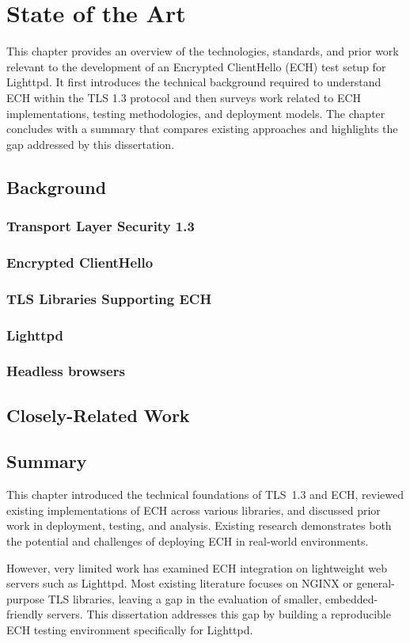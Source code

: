 \chapter{State of the Art}

This chapter provides an overview of the technologies, standards, and prior work
relevant to the development of an Encrypted ClientHello (ECH) test setup for Lighttpd.
It first introduces the technical background required to understand ECH within the
TLS 1.3 protocol and then surveys work related to ECH implementations, testing
methodologies, and deployment models. The chapter concludes with a summary that
compares existing approaches and highlights the gap addressed by this dissertation.

\section{Background}

\subsection{Transport Layer Security 1.3}


\subsection{Encrypted ClientHello}


\subsection{TLS Libraries Supporting ECH}

\subsection{Lighttpd}

\subsection{Headless browsers}


\section{Closely-Related Work}

\section{Summary}

This chapter introduced the technical foundations of TLS~1.3 and ECH, reviewed
existing implementations of ECH across various libraries, and discussed prior work
in deployment, testing, and analysis. Existing research demonstrates both the
potential and challenges of deploying ECH in real-world environments.

However, very limited work has examined ECH integration on lightweight web servers
such as Lighttpd. Most existing literature focuses on NGINX or general-purpose TLS
libraries, leaving a gap in the evaluation of smaller, embedded-friendly servers.
This dissertation addresses this gap by building a reproducible ECH testing
environment specifically for Lighttpd.


